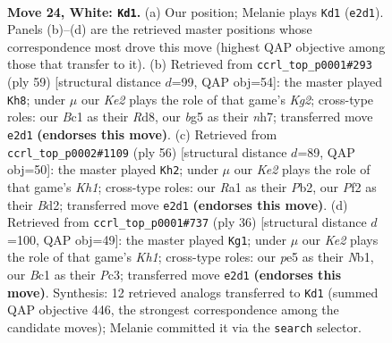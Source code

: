 \documentclass[11pt]{article}
\begin{document}
\clearpage

\begin{figure}[p]\centering
\begin{subfigure}{0.46\textwidth}\centering
\resizebox{\linewidth}{!}{%
\newchessgame
\chessboard[
  setfen={rn2k3/2Q5/3p4/pb1Pppb1/6p1/8/PPP1KPP1/R1B1R2r w q - 0 24},
  showmover=false,
  pgfstyle=straightmove, color=movearrow, markmove={e2-d1}
]}
\caption{}
\end{subfigure}\hfill
\begin{subfigure}{0.46\textwidth}\centering
\resizebox{\linewidth}{!}{%
\newchessgame
\chessboard[
  setfen={2rr4/pp3pkN/2b2p2/8/PnpP3P/4P1R1/1PB3P1/4R1K1 b - - 6 30},
  showmover=false,
  pgfstyle=straightmove, color=movearrow, markmove={g7-h8}
]}
\caption{}
\end{subfigure}
\\[4pt]
\begin{subfigure}{0.46\textwidth}\centering
\resizebox{\linewidth}{!}{%
\newchessgame
\chessboard[
  setfen={r5k1/1p1Q4/p2p2pp/P1pp4/3b4/6nP/1PPB2P1/5R1K w - - 1 29},
  showmover=false,
  pgfstyle=straightmove, color=movearrow, markmove={h1-h2}
]}
\caption{}
\end{subfigure}\hfill
\begin{subfigure}{0.46\textwidth}\centering
\resizebox{\linewidth}{!}{%
\newchessgame
\chessboard[
  setfen={r3kb2/1pQ2p1p/p4B2/4p3/4P3/2P4q/PP6/RN3R1K w q - 2 19},
  showmover=false,
  pgfstyle=straightmove, color=movearrow, markmove={h1-g1}
]}
\caption{}
\end{subfigure}
\caption{\textbf{Move 24, White: \texttt{Kd1}.} (a) Our position; Melanie plays \texttt{Kd1} (\texttt{e2d1}). Panels (b)--(d) are the retrieved master positions whose correspondence most drove this move (highest QAP objective among those that transfer to it). (b) Retrieved from \texttt{ccrl\_top\_p0001\#293} (ply 59) [structural distance $d$=99, QAP obj=54]: the master played \texttt{Kh8}; under $\mu$ our \emph{Ke2} plays the role of that game's \emph{Kg2}; cross-type roles: our \emph{B}c1 as their \emph{R}d8, our \emph{b}g5 as their \emph{n}h7; transferred move \texttt{e2d1} \textbf{(endorses this move)}. (c) Retrieved from \texttt{ccrl\_top\_p0002\#1109} (ply 56) [structural distance $d$=89, QAP obj=50]: the master played \texttt{Kh2}; under $\mu$ our \emph{Ke2} plays the role of that game's \emph{Kh1}; cross-type roles: our \emph{R}a1 as their \emph{P}b2, our \emph{P}f2 as their \emph{B}d2; transferred move \texttt{e2d1} \textbf{(endorses this move)}. (d) Retrieved from \texttt{ccrl\_top\_p0001\#737} (ply 36) [structural distance $d$=100, QAP obj=49]: the master played \texttt{Kg1}; under $\mu$ our \emph{Ke2} plays the role of that game's \emph{Kh1}; cross-type roles: our \emph{p}e5 as their \emph{N}b1, our \emph{B}c1 as their \emph{P}c3; transferred move \texttt{e2d1} \textbf{(endorses this move)}. Synthesis: 12 retrieved analogs transferred to \texttt{Kd1} (summed QAP objective 446, the strongest correspondence among the candidate moves); Melanie committed it via the \texttt{search} selector.}
\label{fig:thought-m46}
\end{figure}
\end{document}
